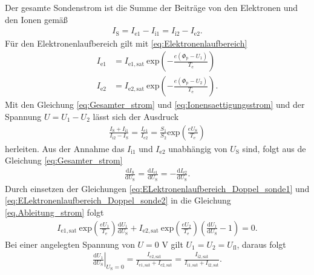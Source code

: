 Der gesamte Sondenstrom ist die Summe der Beiträge von den Elektronen und den Ionen gemäß
\begin{align}
I_{\mathrm{S}}=I_{\mathrm{e}1} -I_{\mathrm{i}1} = I_{\mathrm{i}2} -I_{\mathrm{e}2}.
\label{eq:Gesamter_strom}
\end{align} 
Für den Elektronenlaufbereich gilt mit \eqref{eq:Elektronenlaufbereich}
\begin{align}
I_{\mathrm{e}1} &=I_{\mathrm{e}1,\mathrm{sat}}\ \mathrm{exp} \left( -\frac{e(\Phi_{\mathrm{p}}-U_1)}{T_{\mathrm{e}}} \right) \label{eq:ELektronenlaufbereich_Doppel_sonde1} \\
I_{\mathrm{e}2} &=I_{\mathrm{e}2,\mathrm{sat}}\ \mathrm{exp} \left( -\frac{e(\Phi_{\mathrm{p}}-U_2)}{T_{\mathrm{e}}} \right). 
\label{eq:ELektronenlaufbereich_Doppel_sonde2}
\end{align}
Mit den Gleichung \eqref{eq:Gesamter_strom} und  \eqref{eq:Ionensaettigungsstrom} und der Spannung $U=U_1-U_2$ lässt sich der Ausdruck
\begin{align}
\frac{I_{\mathrm{S}} + I_{\mathrm{i}1}}{ I_{\mathrm{i}2} - I_{\mathrm{S}}}= \frac{I_{\mathrm{e}1}}{I_{\mathrm{e}2}}= \frac{S_1}{S_2} \mathrm{exp} \left( \frac{e U_{\mathrm{S}}}{T_{\mathrm{e}}} \right)
\end{align}
herleiten. Aus der Annahme das $I_{\mathrm{i}1}$ und $I_{\mathrm{e}2}$ unabhängig von $U_{\mathrm{S}}$ sind, folgt aus de Gleichung \eqref{eq:Gesamter_strom}
\begin{align}
\frac{\mathrm{d} I_{\mathrm{S}}}{\mathrm{d} U_{\mathrm{S}}}= \frac{\mathrm{d} I_{\mathrm{e}1}}{\mathrm{d} U_{\mathrm{S}}}= -\frac{\mathrm{d} I_{\mathrm{e}2}}{\mathrm{d} U_{\mathrm{S}}}.
\label{eq.Ableitung_strom}
\end{align}
Durch einsetzen der Gleichungen \eqref{eq:ELektronenlaufbereich_Doppel_sonde1} und \eqref{eq:ELektronenlaufbereich_Doppel_sonde2} in die Gleichung \eqref{eq.Ableitung_strom} folgt
\begin{align}
I_{\mathrm{e}1,\mathrm{sat}}\ \mathrm{exp} \left( \frac{e U_1}{T_{\mathrm{e}}} \right) \frac{\mathrm{d} U_1}{\mathrm{d} U_{\mathrm{S}}} + I_{\mathrm{e}2,\mathrm{sat}}\ \mathrm{exp} \left( \frac{e U_2}{T_{\mathrm{e}}} \right)  \left( \frac{\mathrm{d} U_1}{\mathrm{d} U_{\mathrm{S}}} -1 \right) =0.
\end{align}
Bei einer angelegten Spannung von $U=0$ V gilt $U_1=U_2=U_{\mathrm{fl}}$, daraus folgt
\begin{align}
\left. \frac{\mathrm{d} U_1}{\mathrm{d} U_{\mathrm{S}}}\right\vert_{U_{\mathrm{S}}=0}= \frac{I_{\mathrm{e}2,\mathrm{sat}}}{I_{\mathrm{e}1,\mathrm{sat}}+I_{\mathrm{e}2,\mathrm{sat}}}=\frac{I_{\mathrm{i}2,\mathrm{sat}}}{I_{\mathrm{i}1,\mathrm{sat}}+I_{\mathrm{i}2,\mathrm{sat}}}.
\label{eq:Ableitung_2}
\end{align}  
